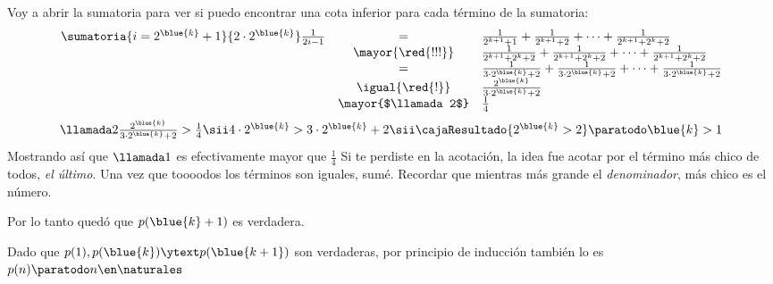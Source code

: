 \begin{enumerate}[label=\magenta{\roman*)}]
        Voy a abrir la sumatoria para ver si puedo encontrar una cota inferior para cada término de la sumatoria:
        $$
          \begin{array}{rcl}
            \sumatoria{i=2^{\blue{k}} + 1}{2 \cdot 2^{\blue{k}}} \frac{1}{2i-1}
             & =                   &
            \frac{1}{2^{k+1} + 1} +
            \frac{1}{2^{k+1} + 2} +
            \cdots +
            \frac{1}{2^{k+1} + 2^k + 2}                   \\
             & \mayor{\red{!!!}}   &
            \frac{1}{2^{k+1} + 2^k + 2} +
            \frac{1}{2^{k+1} + 2^k + 2} +
            \cdots +
            \frac{1}{2^{k+1} + 2^k + 2}                   \\
             & =                   &
            \frac{1}{3 \cdot 2^{\blue{k}} + 2} +
            \frac{1}{3 \cdot 2^{\blue{k}} + 2} +
            \cdots +
            \frac{1}{3 \cdot 2^{\blue{k}}+ 2}             \\
             & \igual{\red{!}}     &
            \frac{2^{\blue{k}}}{3 \cdot 2^{\blue{k}} + 2} \\
             & \mayor{$\llamada2$} &
            \frac{1}{4}
          \end{array}
        $$
        $$
          \textstyle
          \llamada2
          \frac{2^{\blue{k}}}{3 \cdot 2^{\blue{k}} + 2} > \frac{1}{4}
          \sii
          4 \cdot 2^{\blue{k}} > 3 \cdot 2^{\blue{k}} + 2
          \sii
          \cajaResultado{2^{\blue{k}} >  2} \paratodo \blue{k}>1
        $$
        Mostrando así que $\llamada1$ es efectivamente mayor que $\frac{1}{4}$
        Si te perdiste en la acotación, la idea fue acotar por el término más chico de todos, \textit{el último}. Una vez que
        toooodos los términos son iguales, sumé. Recordar que mientras más grande el \textit{denominador}, más chico es el número.

        Por lo tanto quedó que $p(\blue{k} + 1)$ es verdadera.

        Dado que $p(1), p(\blue{k}) \ytext p(\blue{k + 1})$ son verdaderas,
        por principio de inducción también lo es $p(n) \paratodo n \en \naturales$


\end{enumerate}

